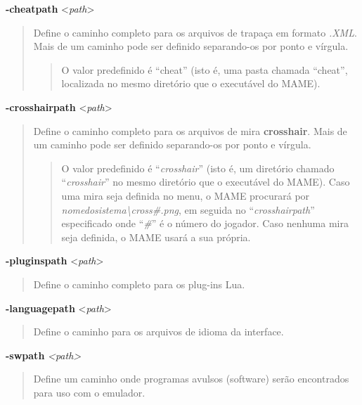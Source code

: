 \documentclass[letterpaper,10pt,brazil]{sphinxmanual}
\begin{document}
\label{commandline/commandline-all:mame-commandline-cheatpath}
\textbf{-cheatpath} \textless{}\emph{path}\textgreater{}
\begin{quote}

Define o caminho completo para os arquivos de trapaça em formato
\emph{.XML}.
Mais de um caminho pode ser definido separando-os por ponto e
vírgula.
\begin{quote}

O valor predefinido é ``cheat'' (isto é, uma pasta chamada ``cheat'',
localizada no mesmo diretório que o executável do MAME).
\end{quote}
\end{quote}
\label{commandline/commandline-all:mame-commandline-crosshairpath}
\textbf{-crosshairpath} \textless{}\emph{path}\textgreater{}
\begin{quote}

Define o caminho completo para os arquivos de mira \textbf{crosshair}.
Mais de um caminho pode ser definido separando-os por ponto e
vírgula.
\begin{quote}

O valor predefinido é ``\emph{crosshair}'' (isto é, um diretório
chamado ``\emph{crosshair}'' no mesmo diretório que o executável do
MAME). Caso uma mira seja definida no menu, o MAME procurará por
\emph{nomedosistema\textbackslash{}cross\#.png}, em seguida no ``\emph{crosshairpath}''
especificado onde ``\emph{\#}'' é o número do jogador.
Caso nenhuma mira seja definida, o MAME usará a sua própria.
\end{quote}
\end{quote}
\label{commandline/commandline-all:mame-commandline-pluginspath}
\textbf{-pluginspath} \textless{}\emph{path}\textgreater{}
\begin{quote}

Define o caminho completo para os plug-ins Lua.
\end{quote}
\label{commandline/commandline-all:mame-commandline-languagepath}
\textbf{-languagepath} \textless{}\emph{path}\textgreater{}
\begin{quote}

Define o caminho para os arquivos de idioma da interface.
\end{quote}
\label{commandline/commandline-all:mame-commandline-swpath}
\textbf{-swpath} \emph{\textless{}path\textgreater{}}
\begin{quote}

Define um caminho onde programas avulsos (software) serão
encontrados para uso com o emulador.
\end{quote}
\end{document}
